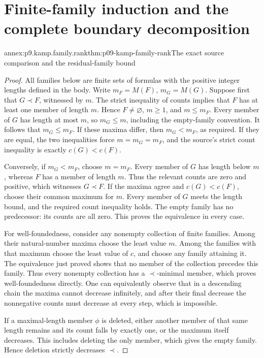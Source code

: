 
\section{Finite-family induction and the complete boundary decomposition}
\label{sec:annex-p09-kamp-iii2-lemma8-foundations}

\begin{annexitem}{annex:p9.kamp.family.rank}{thm:p09-kamp-family-rank}{The exact source comparison and the residual-family bound}
\begin{proof}
All families below are finite sets of formulas with the positive integer
lengths defined in the body. Write \(m_F=M(F)\), \(m_G=M(G)\).
Suppose first that \(G\prec F\), witnessed by \(m\).
The strict inequality of counts implies that \(F\) has at least
one member of length \(m\). Hence \(F\ne\varnothing\),
\(m\geq1\), and \(m\leq m_F\). Every member of \(G\)
has length at most \(m\), so \(m_G\leq m\), including
the empty-family convention. It follows that \(m_G\leq m_F\).
If these maxima differ, then \(m_G<m_F\), as required.
If they are equal, the two inequalities force \(m=m_G=m_F\),
and the source's strict count inequality is exactly \(c(G)<c(F)\).

Conversely, if \(m_G<m_F\), choose \(m=m_F\).
Every member of \(G\) has length below \(m\), whereas
\(F\) has a member of length \(m\). Thus the relevant
counts are zero and positive, which witnesses \(G\prec F\).
If the maxima agree and \(c(G)<c(F)\), choose their common
maximum for \(m\). Every member of \(G\) meets the length
bound, and the required count inequality holds. The empty family
has no predecessor: its counts are all zero. This proves the
equivalence in every case.

For well-foundedness, consider any nonempty collection of finite families.
Among their natural-number maxima choose the least value \(m\).
Among the families with that maximum choose the least value of
\(c\), and choose any family attaining it. The equivalence just
proved shows that no member of the collection precedes this family.
Thus every nonempty collection has a \(\prec\)-minimal member,
which proves well-foundedness directly. One can equivalently observe
that in a descending chain the maxima cannot decrease infinitely,
and after their final decrease the nonnegative counts must decrease
at every step, which is impossible.

If a maximal-length member \(\phi\) is deleted, either another
member of that same length remains and its count falls by exactly one,
or the maximum itself decreases. This includes deleting the only member,
which gives the empty family. Hence deletion strictly decreases \(\prec\).


\end{proof}
\end{annexitem}
